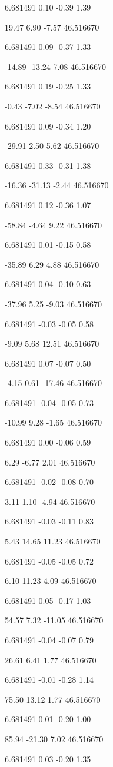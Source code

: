 6.681491
0.10
-0.39
1.39

19.47
6.90
-7.57
46.516670

6.681491
0.09
-0.37
1.33

-14.89
-13.24
7.08
46.516670

6.681491
0.19
-0.25
1.33

-0.43
-7.02
-8.54
46.516670

6.681491
0.09
-0.34
1.20

-29.91
2.50
5.62
46.516670

6.681491
0.33
-0.31
1.38

-16.36
-31.13
-2.44
46.516670

6.681491
0.12
-0.36
1.07

-58.84
-4.64
9.22
46.516670

6.681491
0.01
-0.15
0.58

-35.89
6.29
4.88
46.516670

6.681491
0.04
-0.10
0.63

-37.96
5.25
-9.03
46.516670

6.681491
-0.03
-0.05
0.58

-9.09
5.68
12.51
46.516670

6.681491
0.07
-0.07
0.50

-4.15
0.61
-17.46
46.516670

6.681491
-0.04
-0.05
0.73

-10.99
9.28
-1.65
46.516670

6.681491
0.00
-0.06
0.59

6.29
-6.77
2.01
46.516670

6.681491
-0.02
-0.08
0.70

3.11
1.10
-4.94
46.516670

6.681491
-0.03
-0.11
0.83

5.43
14.65
11.23
46.516670

6.681491
-0.05
-0.05
0.72

6.10
11.23
4.09
46.516670

6.681491
0.05
-0.17
1.03

54.57
7.32
-11.05
46.516670

6.681491
-0.04
-0.07
0.79

26.61
6.41
1.77
46.516670

6.681491
-0.01
-0.28
1.14

75.50
13.12
1.77
46.516670

6.681491
0.01
-0.20
1.00

85.94
-21.30
7.02
46.516670

6.681491
0.03
-0.20
1.35

